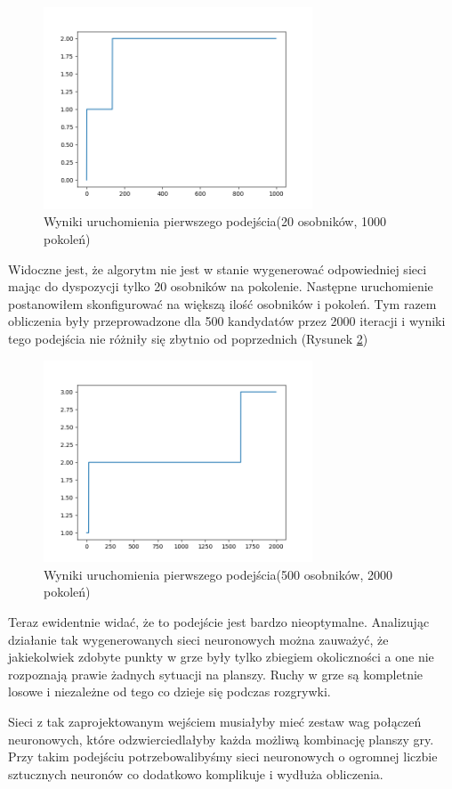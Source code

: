 \documentclass[12pt, oneside, a4paper]{report}
\begin{document}
\begin{figure}[h]
	\centering
	\includegraphics[width=8cm]{fig41.png}
	\caption{Wyniki uruchomienia pierwszego podejścia(20 osobników, 1000 pokoleń) }
	\label{fig: 4.4.2.1}
\end{figure}
\newpage
Widoczne jest, że algorytm nie jest w stanie wygenerować odpowiedniej sieci mając do dyspozycji tylko 20 osobników na pokolenie. Następne uruchomienie postanowiłem skonfigurować na większą ilość osobników i pokoleń. Tym razem obliczenia były przeprowadzone dla 500 kandydatów przez 2000 iteracji i wyniki tego podejścia nie różniły się zbytnio od poprzednich (Rysunek \ref{fig: 4.4.2.2})

\begin{figure}[h]
	\centering
	\includegraphics[width=8cm]{fig42.png}
	\caption{Wyniki uruchomienia pierwszego podejścia(500 osobników, 2000 pokoleń) }
	\label{fig: 4.4.2.2}
\end{figure}

Teraz ewidentnie widać, że to podejście jest bardzo nieoptymalne. Analizując działanie tak wygenerowanych sieci neuronowych można zauważyć, że jakiekolwiek zdobyte punkty w grze były tylko zbiegiem okoliczności a one nie rozpoznają prawie żadnych sytuacji na planszy. Ruchy w grze są kompletnie losowe i niezależne od tego co dzieje się podczas rozgrywki.

Sieci z tak zaprojektowanym wejściem musiałyby mieć zestaw wag połączeń neuronowych, które odzwierciedlałyby każda możliwą kombinację planszy gry. Przy takim podejściu potrzebowalibyśmy sieci neuronowych o ogromnej liczbie sztucznych neuronów co dodatkowo komplikuje i wydłuża obliczenia.
\end{document}
